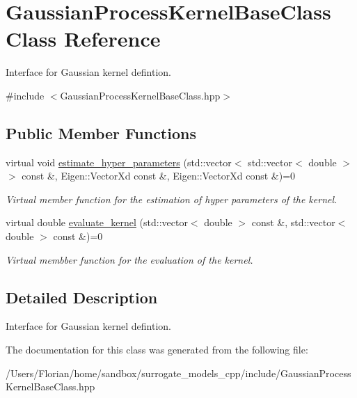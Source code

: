 \hypertarget{class_gaussian_process_kernel_base_class}{}\section{Gaussian\+Process\+Kernel\+Base\+Class Class Reference}
\label{class_gaussian_process_kernel_base_class}


Interface for Gaussian kernel defintion.  




{\ttfamily \#include $<$Gaussian\+Process\+Kernel\+Base\+Class.\+hpp$>$}

\subsection*{Public Member Functions}
\begin{DoxyCompactItemize}
\item 
virtual void \hyperlink{class_gaussian_process_kernel_base_class_a8b5f3bc6aa6cb037adc6f2de0bb3a729}{estimate\+\_\+hyper\+\_\+parameters} (std\+::vector$<$ std\+::vector$<$ double $>$ $>$ const \&, Eigen\+::\+Vector\+Xd const \&, Eigen\+::\+Vector\+Xd const \&)=0\hypertarget{class_gaussian_process_kernel_base_class_a8b5f3bc6aa6cb037adc6f2de0bb3a729}{}\label{class_gaussian_process_kernel_base_class_a8b5f3bc6aa6cb037adc6f2de0bb3a729}

\begin{DoxyCompactList}\small\item\em Virtual member function for the estimation of hyper parameters of the kernel. \end{DoxyCompactList}\item 
virtual double \hyperlink{class_gaussian_process_kernel_base_class_abcac50e030c8f07517011a8164b3d681}{evaluate\+\_\+kernel} (std\+::vector$<$ double $>$ const \&, std\+::vector$<$ double $>$ const \&)=0\hypertarget{class_gaussian_process_kernel_base_class_abcac50e030c8f07517011a8164b3d681}{}\label{class_gaussian_process_kernel_base_class_abcac50e030c8f07517011a8164b3d681}

\begin{DoxyCompactList}\small\item\em Virtual membber function for the evaluation of the kernel. \end{DoxyCompactList}\end{DoxyCompactItemize}


\subsection{Detailed Description}
Interface for Gaussian kernel defintion. 

The documentation for this class was generated from the following file\+:\begin{DoxyCompactItemize}
\item 
/\+Users/\+Florian/home/sandbox/surrogate\+\_\+models\+\_\+cpp/include/Gaussian\+Process\+Kernel\+Base\+Class.\+hpp\end{DoxyCompactItemize}
